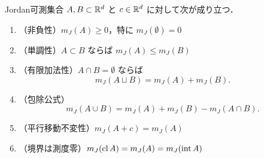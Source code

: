\begin{theorem}[Jordan測度の性質]
Jordan可測集合 $A,B \subset \mathbb R^d$ と $c \in \mathbb R^d$ に対して次が成り立つ．
\begin{enumerate}
    \item （非負性）$m_J(A) \ge 0$，特に $m_J(\emptyset)=0$
    \item （単調性）$A \subset B$ ならば $m_J(A) \le m_J(B)$
    \item （有限加法性）$A \cap B = \emptyset$ ならば
    \[
    m_J(A \sqcup B) = m_J(A) + m_J(B).
    \]
    \item （包除公式）
    \[
    m_J(A \cup B) = m_J(A) + m_J(B) - m_J(A \cap B).
    \]
    \item （平行移動不変性）$m_J(A+c)=m_J(A)$
    \item （境界は測度零）$m_J(\operatorname{cl} A)=m_J(A)=m_J(\operatorname{int} A)$
\end{enumerate}
\end{theorem}
